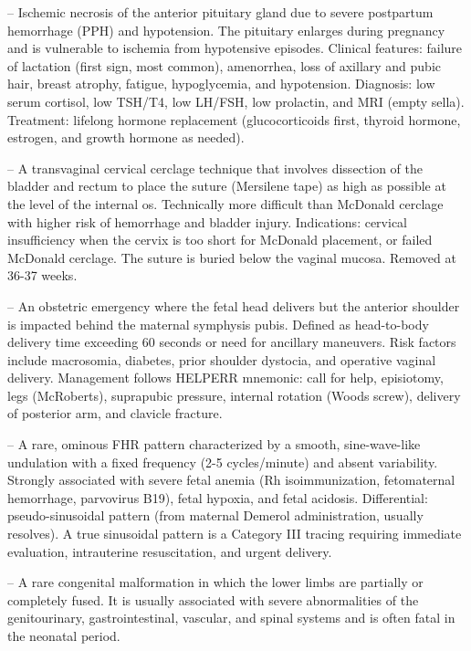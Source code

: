 -- Ischemic necrosis of the anterior pituitary gland due to severe postpartum hemorrhage (PPH) and hypotension. The pituitary enlarges during pregnancy and is vulnerable to ischemia from hypotensive episodes. Clinical features: failure of lactation (first sign, most common), amenorrhea, loss of axillary and pubic hair, breast atrophy, fatigue, hypoglycemia, and hypotension. Diagnosis: low serum cortisol, low TSH/T4, low LH/FSH, low prolactin, and MRI (empty sella). Treatment: lifelong hormone replacement (glucocorticoids first, thyroid hormone, estrogen, and growth hormone as needed).

-- A transvaginal cervical cerclage technique that involves dissection of the bladder and rectum to place the suture (Mersilene tape) as high as possible at the level of the internal os. Technically more difficult than McDonald cerclage with higher risk of hemorrhage and bladder injury. Indications: cervical insufficiency when the cervix is too short for McDonald placement, or failed McDonald cerclage. The suture is buried below the vaginal mucosa. Removed at 36-37 weeks.


-- An obstetric emergency where the fetal head delivers but the anterior shoulder is impacted behind the maternal symphysis pubis. Defined as head-to-body delivery time exceeding 60 seconds or need for ancillary maneuvers. Risk factors include macrosomia, diabetes, prior shoulder dystocia, and operative vaginal delivery. Management follows HELPERR mnemonic: call for help, episiotomy, legs (McRoberts), suprapubic pressure, internal rotation (Woods screw), delivery of posterior arm, and clavicle fracture.

-- A rare, ominous FHR pattern characterized by a smooth, sine-wave-like undulation with a fixed frequency (2-5 cycles/minute) and absent variability. Strongly associated with severe fetal anemia (Rh isoimmunization, fetomaternal hemorrhage, parvovirus B19), fetal hypoxia, and fetal acidosis. Differential: pseudo-sinusoidal pattern (from maternal Demerol administration, usually resolves). A true sinusoidal pattern is a Category III tracing requiring immediate evaluation, intrauterine resuscitation, and urgent delivery.

-- A rare congenital malformation in which the lower limbs are partially or completely fused. It is usually associated with severe abnormalities of the genitourinary, gastrointestinal, vascular, and spinal systems and is often fatal in the neonatal period.

